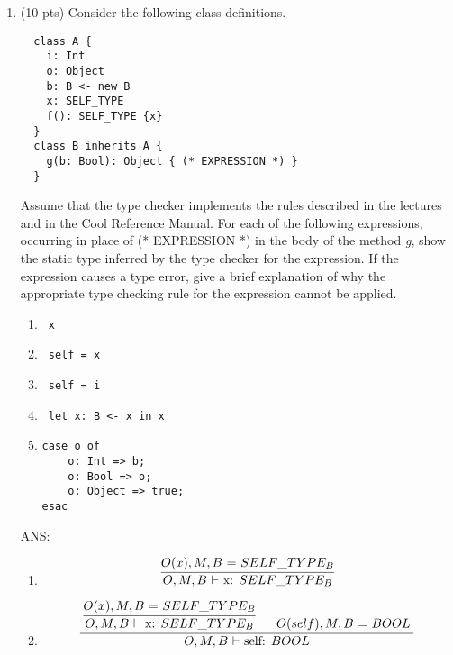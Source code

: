 \documentclass[10pt]{article}
\newcommand{\infertext}[2]{\infer{{\textrm{#1}}}{#2}}
\begin{document}
\begin{enumerate}
\item (10 pts) Consider the following class definitions.
\begin{verbatim}
  class A {
    i: Int
    o: Object
    b: B <- new B
    x: SELF_TYPE
    f(): SELF_TYPE {x}
  }
  class B inherits A {
    g(b: Bool): Object { (* EXPRESSION *) }
  }
\end{verbatim}

Assume that the type checker implements the rules described in the lectures and in the Cool Reference
Manual. For each of the following expressions, occurring in place of (* EXPRESSION *) in the body
of the method \emph{g}, show the static type inferred by the type checker for the expression. If the expression
causes a type error, give a brief explanation of why the appropriate type checking rule for the expression
cannot be applied.

\begin{enumerate}
  \item \begin{verbatim} x \end{verbatim}
  \item \begin{verbatim} self = x \end{verbatim}
  \item \begin{verbatim} self = i \end{verbatim}
  \item \begin{verbatim} let x: B <- x in x \end{verbatim}
  \item \begin{verbatim}
case o of
    o: Int => b;
    o: Bool => o;
    o: Object => true;
esac
\end{verbatim}
\end{enumerate}
ANS:
\begin{enumerate}
  \item \[\infertext
          {$O,M,B$ $\vdash$ x: $SELF\_TYPE_B$}
          {\textrm{$O(x),M,B$ = $SELF\_TYPE_B$}}       
        \]

  \item \[\infertext
          {$O,M,B$ $\vdash$ self: $BOOL$}
          {\textrm{
              \infertext
              {$O,M,B$ $\vdash$ x: $SELF\_TYPE_B$}
              {\textrm{$O(x),M,B$ = $SELF\_TYPE_B$}}
              \ \ \ \ 
              {$O(self),M,B$ = $BOOL$}
          }}            
        \]


\end{enumerate}
\end{enumerate}
\end{document}
